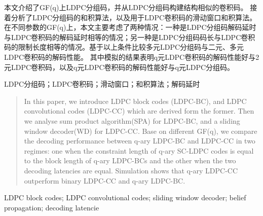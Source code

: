 

\begin{zhaiyao}
本文介绍了GF(q)上LDPC分组码，并从LDPC分组码构建结构相似的卷积码。
接着分析了LDPC分组码的和积算法，以及用于LDPC卷积码的滑动窗口和积算法。
在不同参数的GF(q)上，本文主要考虑了两种情况：一种是LDPC分组码解码延时与LDPC卷积码的解码延时相等的情况；另一种是LDPC分组码码长与LDPC卷积码的限制长度相等的情况。基于以上条件比较多元LDPC分组码与二元、多元LDPC卷积码的解码性能。
其中模拟的结果表明q元LDPC卷积码的解码性能好与2元LDPC卷积码，以及q元LDPC卷积码的解码性能好与q元LDPC分组码。
\end{zhaiyao}


\begin{guanjianci}
LDPC分组码；LDPC卷积码；滑动窗口；和积算法；解码延时
\end{guanjianci}



\begin{abstract}
In this paper, we introduce LDPC block codes (LDPC-BC), and LDPC convolutional codes (LDPC-CC) which are derived form the former. Then we analyse sum product algorithm(SPA) for LDPC-BC, and a sliding window decoder(WD) for LDPC-CC. Base on different GF(q), we compare the decoding performance between q-ary LDPC-BC and LDPC-CC in two regimes: one when the constraint length of q-ary SC-LDPC codes is equal to the block length of q-ary LDPC-BCs and the other when the two decoding latencies are equal. Simulation shows that q-ary LDPC-CC outperform binary LDPC-CC and q-ary LDPC-BC.
\end{abstract}


\begin{keywords}
LDPC block codes; LDPC convolutional codes; sliding window decoder; belief propagation; decoding latencie
\end{keywords} 